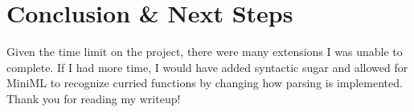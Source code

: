 \documentclass{article}
\begin{document}
\section{Conclusion \& Next Steps}
Given the time limit on the project, there were many extensions I was unable to complete. If I had more time, I would have added syntactic sugar and allowed for MiniML to recognize curried functions by changing how parsing is implemented. Thank you for reading my writeup!
\end{document}
